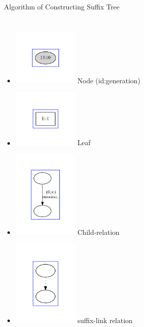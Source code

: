 \begin{frame}{Algorithm of Constructing Suffix Tree}
\begin{columns}
\begin{itemize}
\item<2-> 
\includegraphics[width=0.25\textwidth,trim=40pt 40pt 40pt 40pt]{gray.pdf} 
Node (id:generation)
\item<3-> 
\includegraphics[width=0.25\textwidth,trim=40pt 40pt 40pt 40pt]{box.pdf} 
Leaf
\item<4-> 
\includegraphics[width=0.25\textwidth,trim=40pt 40pt 40pt 40pt]{line.pdf} 
Child-relation
\item<5-> 
\includegraphics[width=0.25\textwidth,trim=40pt 40pt 40pt 40pt]{dotted.pdf} 
suffix-link relation
\end{itemize}
\end{columns}
\end{frame}

